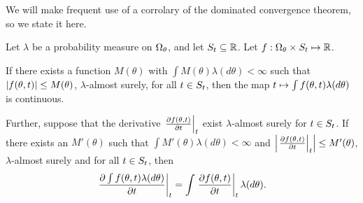 We will make frequent use of a corrolary of the dominated convergence
theorem, so we state it here.

\begin{thm}
\citep[Theorem 16.8]{billingsley:1986:probability}
%
Let $\lambda$ be a probability measure on $\Omega_{\theta}$, and let $S_t \subseteq
\mathbb{R}$.  Let $f:\Omega_{\theta} \times S_t \mapsto \mathbb{R}$.

If there exists a function $M(\theta)$ with $\int M(\theta) \lambda(d\theta) <
\infty$ such that $\left|f(\theta, t)\right| \le M(\theta)$, $\lambda$-almost surely,
for all $t \in S_t$, then the map $t \mapsto \int f(\theta, t)
\lambda(d\theta)$ is continuous.

Further, suppose that the derivative $\left.\frac{\partial f(\theta, t)}{\partial
t}\right\vert_{t}$ exist $\lambda$-almost surely for $t \in S_t$.  If there exists
an $M'(\theta)$ such that $\int M'(\theta) \lambda(d\theta) < \infty$ and
$\left|\left.\frac{\partial f(\theta, t)}{\partial t}\right\vert_{t}\right| \le M'(\theta)$,
$\lambda$-almost surely and for all $t \in S_t$, then
%
\begin{align*}
%
\fracat{\partial \int f(\theta, \t) \lambda(d\theta)}{\partial \t}{\t} =
     \int \fracat{\partial f(\theta, \t)}{\partial \t}{\t} \lambda(d\theta).
%
\end{align*}
%
\end{thm}

